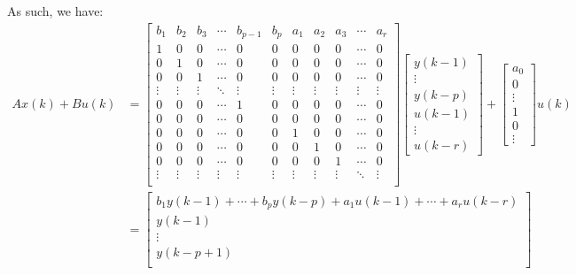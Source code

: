 \documentclass[12pt]{exam}
\begin{document}
\begin{questions}
\begin{solution}
As such, we have:
\begin{align*}
  Ax(k) + Bu(k) &= 
    \begin{bmatrix}
      b_1 & b_2 & b_3 & \cdots & b_{p-1} & b_p & a_1 & a_2 & a_3 & \cdots & a_r \\
      1 & 0 & 0 & \cdots & 0 & 0 & 0 & 0 & 0 & \cdots & 0 \\
      0 & 1 & 0 & \cdots & 0 & 0 & 0 & 0 & 0 & \cdots & 0 \\
      0 & 0 & 1 & \cdots & 0 & 0 & 0 & 0 & 0 & \cdots & 0 \\
      \vdots & \vdots & \vdots & \ddots & \vdots & \vdots & \vdots & \vdots & \vdots & \vdots & \vdots \\
      0 & 0 & 0 & \cdots & 1 & 0 & 0 & 0 & 0 & \cdots & 0 \\
      0 & 0 & 0 & \cdots & 0 & 0 & 0 & 0 & 0 & \cdots & 0 \\
      0 & 0 & 0 & \cdots & 0 & 0 & 1 & 0 & 0 & \cdots & 0 \\
      0 & 0 & 0 & \cdots & 0 & 0 & 0 & 1 & 0 & \cdots & 0 \\
      0 & 0 & 0 & \cdots & 0 & 0 & 0 & 0 & 1 & \cdots & 0 \\
      \vdots & \vdots & \vdots & \vdots & \vdots & \vdots & \vdots & \vdots & \vdots & \ddots & \vdots \\
    \end{bmatrix}
    \begin{bmatrix}
      y(k-1) \\
      \vdots \\
      y(k-p) \\
      u(k-1) \\
      \vdots \\
      u(k-r)
    \end{bmatrix} + 
    \begin{bmatrix}
      a_0 \\
      0 \\
      \vdots \\
      1 \\
      0 \\
      \vdots
    \end{bmatrix} u(k) \\
  &=
    \begin{bmatrix}
      b_1y(k-1) + \cdots + b_py(k-p) + a_1u(k-1) + \cdots + a_r u(k-r) \\
      y(k-1) \\ 
      \vdots \\
      y(k-p + 1) \\

\end{bmatrix}
\end{align*}
\end{solution}
\end{questions}
\end{document}
